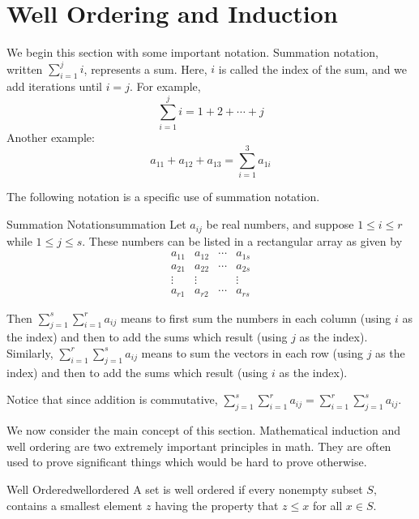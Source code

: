 \section{Well Ordering and Induction}

\label{wellorderingsection}

We begin this section with some important notation. Summation notation, written $\sum_{i=1}^{j} i $, represents a sum. Here, $i$ is called the index of the sum, and we add iterations until $i=j$. For example, 
\[
\sum_{i=1}^{j} i = 1 + 2 + \cdots + j 
\]
Another example: 
\[
a_{11} + a_{12} + a_{13}  = \sum_{i=1}^{3} a_{1i}
\]

The following notation is a specific use of summation notation. 

\begin{notation}{Summation Notation}{summation}
Let $a_{ij}$ be real numbers, and suppose  $1\leq i\leq r$ while $
1\leq j\leq s$. These numbers can be listed in a rectangular array as given by 
\begin{equation*}
\begin{array}{cccc}
a_{11} & a_{12} & \cdots & a_{1s} \\ 
a_{21} & a_{22} & \cdots & a_{2s} \\ 
\vdots & \vdots &  & \vdots \\ 
a_{r1} & a_{r2} & \cdots & a_{rs}
\end{array}
\end{equation*}

Then $\sum_{j=1}^{s}\sum_{i=1}^{r} a_{ij}$ means to first sum the numbers
in each column (using $i$ as the index) and then to add the sums which result (using $j$ as the index). Similarly,  
$\sum_{i=1}^{r}\sum_{j=1}^{s} a_{ij}$ means to sum the vectors in
each row (using $j$ as the index) and then to add the sums which result (using $i$ as the index). 
\end{notation}

Notice that since addition is commutative, $\sum_{j=1}^{s}\sum_{i=1}^{r} a_{ij} = \sum_{i=1}^{r}\sum_{j=1}^{s} a_{ij}$. 

We now consider the main concept of this section. Mathematical induction and well ordering are two extremely important
principles in math. They are often used to prove significant things which
would be hard to prove otherwise.

\begin{definition}{Well Ordered}{wellordered}
 A set is well ordered if every nonempty subset $S,$ contains a
smallest element $z$ having the property that $z\leq x$ for all $x\in S.$
\end{definition}

